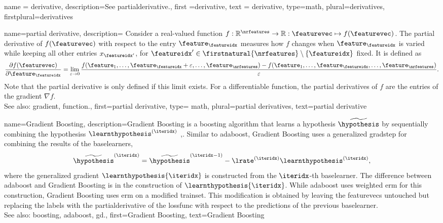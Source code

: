 {name = {derivative}, 
 description={See \gls{partialderivative}.}, 
 first ={derivative}, 
 text = {derivative}, 
 type=math, 
 plural={derivatives}, 
 firstplural={derivatives}
 }


{name={partial derivative},
 description={
		Consider a real-valued \gls{function} 
		$f: \mathbb{R}^{\nrfeatures} \rightarrow \mathbb{R}: \featurevec \mapsto f(\featurevec)$. 
	     The partial derivative of $f(\featurevec)$ 
		 with respect to the entry $\feature_{\featureidx}$ measures how  
		 $f$ changes when $\feature_\featureidx$ is varied while keeping all 
        other entries $x_{\featureidx'}$, for $\featureidx' \in \firstnatural{\nrfeatures} \setminus \{\featureidx \}$ 
		fixed. It is defined as \cite{RudinBookPrinciplesMatheAnalysis}
        $$
            \frac{\partial f(\featurevec)}{\partial \feature_\featureidx}
            = \lim_{\varepsilon \rightarrow 0} 
              \frac{f(\feature_1,\ldots,\feature_{\featureidx}+\varepsilon,\ldots,\feature_\nrfeatures) 
			  - f(\feature_1,\ldots,\feature_\featureidx,\ldots,\feature_\nrfeatures)}{\varepsilon}.$$
		Note that the partial derivative is only defined if this limit exists. 
		For a \gls{differentiable} function, the partial derivatives of $f$ are the entries 
		of the \gls{gradient} $\nabla f$. 
\\
        See also: \gls{gradient}, \gls{function}.},
    first={partial derivative},
	type= math, 
	 plural={partial derivatives},
    text={partial derivative}
}


 {name={Gradient Boosting},
 	description={Gradient Boosting is a \gls{boosting} 
 		\gls{algorithm} that learns a \gls{hypothesis} $\widetilde{\hypothesis}$ 
 		by sequentially combining the \glspl{hypothesis} $\learnthypothesis^{(\iteridx)}$ 
 		\cite{Friedman2001},\cite[Alg. 10.3]{hastie01statisticallearning}. 
 		Similar to \gls{adaboost}, Gradient Boosting uses a generalized \gls{gradstep} 
 		for combining the results of the \glspl{baselearner}, 
        $$\widetilde{\hypothesis}^{(\iteridx)} = \widetilde{\hypothesis}^{(\iteridx-1)}-\lrate^{(\iteridx)} 
 		\learnthypothesis^{(\iteridx)},$$
 		where the generalized gradient $\learnthypothesis{\iteridx}$ is constructed from 
		the $\iteridx$-th \gls{baselearner}.
 		The difference between \gls{adaboost} and Gradient Boosting is in the construction 
		of $\learnthypothesis{\iteridx}$. While \gls{adaboost} uses weighted \gls{erm} for this construction, 
		Gradient Boosting uses \gls{erm} on a modified \gls{trainset}. This modification is obtained 
		by leaving the \glspl{featurevec} untouched but replacing the \glspl{label} with the 
		\gls{partialderivative} of the \gls{lossfunc} with respect to the \glspl{prediction} 
		of the previous \gls{baselearner}.   
 		 \\
 		See also: \gls{boosting}, \gls{adaboost}, \gls{gd}.},
 	first={Gradient Boosting}, 
 	text={Gradient Boosting}
} 

